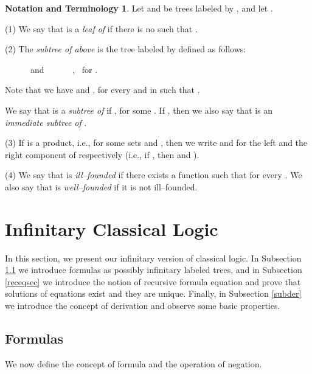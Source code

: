 \documentclass[copyright,creativecommons]{eptcs}
\def\ie{i.e., }
\theoremstyle{definition}
\newtheorem{notation}[theorem]{Notation and Terminology}{\bfseries}{}
\newcommand{\squishlist}{
 \begin{list}{}
  { \setlength{\itemsep}{0pt}
     \setlength{\parsep}{3pt}
     \setlength{\topsep}{3pt}
     \setlength{\partopsep}{0pt}
     \setlength{\leftmargin}{1em}
     \setlength{\labelwidth}{1.5em}
     \setlength{\labelsep}{0.5em} } }
\newcommand{\squishend}{
  \end{list}  }
\begin{document}
\begin{notation} Let  and  be  trees labeled by , and let  .

(1)
 We say that
 is a \emph{leaf of } if  there is no  such that .







(2)
The \emph{subtree of  above } is the tree  labeled
by  defined as follows:

\squishlist
\item[] {\centering \hspace{-0.8cm}
 \ \ \ \ \ \  and \ \ \ \ \ \
  \enspace, \  for
 \enspace.  \par}
\squishend
Note that we have   and , for every   and  in   such that .

We  say that  is a \emph{subtree of} 
if , for some .
If  , then we also say that  is
 an \emph{immediate subtree of }.


(3)
 If  is a product, \ie  for some sets  and , then
 we write  and 
 for the  left and the right component
 of  respectively (\ie if
,  then
 and ).



(4) We say that  is  \emph{ill--founded}
if there exists a function 
such that
 for every . We also say that  is \emph{well--founded} if it is not ill--founded.  \hfill 
\end{notation}






\section{Infinitary Classical Logic} \label{sec3}


In this section, we present
 our infinitary version of classical logic.
In Subsection \ref{forsec}
we introduce formulas
as possibly infinitary labeled trees,
and in Subsection \ref{receqsec}
we introduce the notion of recursive formula equation and prove that
solutions of equations exist and they are unique.
Finally, in Subsection \ref{subder} we introduce the concept of derivation
and observe some basic properties.




\subsection{Formulas} \label{forsec}
We  now define the concept of   formula
and the operation of  negation.
\end{document}
